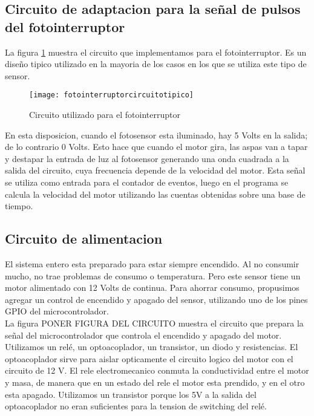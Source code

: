 \subsection{Circuito de adaptacion para la señal de pulsos del fotointerruptor} %
\label{sub:circuito_de_adaptacion_para_la_señal_de_pulsos_del_fotointerruptor}

La figura \ref{fig:fotointerruptorcircuitotipico} muestra el circuito que implementamos para el fotointerruptor. Es un diseño tipico utilizado en la mayoria de los casos en los que se utiliza este tipo de sensor. 

\begin{figure}[h]
  \centering
  \texttt{[image: fotointerruptorcircuitotipico]}
  \caption{Circuito utilizado para el fotointerruptor}\label{fig:fotointerruptorcircuitotipico}
\end{figure}

En esta disposicion, cuando el fotosensor esta iluminado, hay 5 Volts en la salida; de lo contrario 0 Volts. Esto hace que cuando el motor gira, las aspas van a tapar y destapar la entrada de luz al fotosensor generando una onda cuadrada a la salida del circuito, cuya frecuencia depende de la velocidad del motor.
Esta señal se utiliza como entrada para el contador de eventos, luego en el programa se calcula la velocidad del motor utilizando las cuentas obtenidas sobre una base de tiempo. 


\subsection{Circuito de alimentacion} %
\label{sub:circuito_de_alimentacion}

El sistema entero esta preparado para estar siempre encendido. Al no consumir mucho, no trae problemas de consumo o temperatura. Pero este sensor tiene un motor alimentado con 12 Volts de continua. Para ahorrar consumo, propusimos agregar un control de encendido y apagado del sensor, utilizando uno de los pines GPIO del microcontrolador. \\

La figura PONER FIGURA DEL CIRCUITO muestra el circuito que prepara la señal del microcontrolador que controla el encendido y apagado del motor. Utilizamos un relé, un optoacoplador, un transistor, un diodo y resistencias. El optoacoplador sirve para aislar opticamente el circuito logico del motor con el circuito de 12 V. El rele electromecanico conmuta la conductividad entre el motor y masa, de manera que en un estado del rele el motor esta prendido, y en el otro esta apagado. Utilizamos un transistor porque los 5V a la salida del optoacoplador no eran suficientes para la tension de switching del relé.

